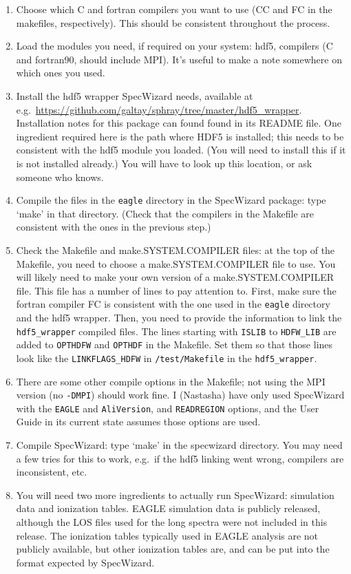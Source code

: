 \documentclass{report}
\newcommand{\param}[1]{{\tt #1}}
\begin{document}
\begin{enumerate}
\item{Choose which C and fortran compilers you want to use (CC and FC in the makefiles, respectively). This should be consistent throughout the process.}
\item{Load the modules you need, if required on your system: hdf5, compilers (C and fortran90, should include MPI). It's useful to make a note somewhere on which ones you used.}
\item{Install the hdf5 wrapper SpecWizard needs, available at e.g.\ \url{https://github.com/galtay/sphray/tree/master/hdf5_wrapper}. Installation notes for this package can found found in its README file. One ingredient required here is the path where HDF5 is installed; this needs to be consistent with the hdf5 module you loaded. (You will need to install this if it is not installed already.) You will have to look up this location, or ask someone who knows.}
\item{Compile the files in the \param{eagle} directory in the SpecWizard package: type `make' in that directory. (Check that the compilers in the Makefile are consistent with the ones in the previous step.)}
\item{Check the Makefile and make.SYSTEM.COMPILER files: at the top of the Makefile, you need to choose a make.SYSTEM.COMPILER file to use. You will likely need to make your own version of a make.SYSTEM.COMPILER file. This file has a number of lines to pay attention to. First, make sure the fortran compiler FC is consistent with the one used in the \param{eagle} directory and the hdf5 wrapper. Then, you need to provide the information to link the \param{hdf5\_wrapper} compiled files. The lines starting with \param{ISLIB} to \param{HDFW\_LIB} are added to \param{OPTHDFW} and \param{OPTHDF} in the Makefile. Set them so that those lines look like the \param{LINKFLAGS\_HDFW} in \param{/test/Makefile} in the \param{hdf5\_wrapper}.}
\item{There are some other compile options in the Makefile; not using the MPI version (no \param{-DMPI}) should work fine. I (Nastasha) have only used SpecWizard with the \param{EAGLE} and \param{AliVersion}, and \param{READREGION} options, and the User Guide in its current state assumes those options are used. }
\item{Compile SpecWizard: type `make' in the specwizard directory.  You may need a few tries for this to work, e.g.\ if the hdf5 linking went wrong, compilers are inconsistent, etc.}
\item{You will need two more ingredients to actually run SpecWizard: simulation data and ionization tables. EAGLE simulation data is publicly released, although the LOS files used for the long spectra were not included in this release. The ionization tables typically used in EAGLE analysis are not publicly available, but other ionization tables are, and can be put into the format expected by SpecWizard.}
\end{enumerate}
\end{document}
